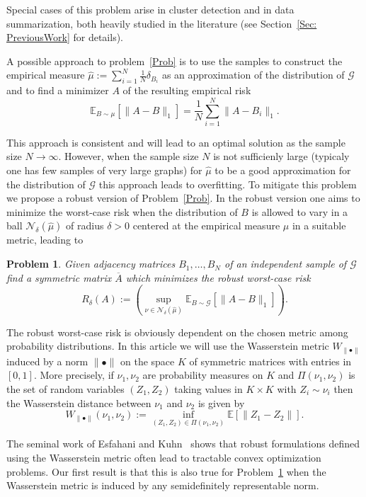 \documentclass[12pt]{amsart}
\newtheorem{problem}[lemma]{Problem}
\theoremstyle{remark}
\newcommand{\EE}{\mathbb{E}}
\newcommand{\grG}{{\mathcal{G}}}
\begin{document}
Special cases of this problem arise in cluster detection and in data summarization, both heavily studied in the literature (see Section~\ref{Sec: PreviousWork} for details).

A possible approach to problem~\ref{Prob} is to use the samples to construct the empirical measure $\hat{\mu}:=\sum_{i=1}^N \frac{1}{N}\delta_{B_i}$ as an approximation of the distribution of $\grG$ and to find a minimizer $A$ of the resulting empirical risk
\[ \EE_{B\sim \mu}[\|A-B\|_1]=\frac{1}{N}\sum_{i=1}^N \|A-B_i\|_1.\]

This approach is consistent and will lead to an optimal solution as the sample size $N\rightarrow \infty$. However, when the sample size $N$ is not sufficienly large (typicaly one has few samples of very large graphs) for $\hat{\mu}$ to be a good approximation for the distribution of $\grG$ this approach leads to overfitting. To mitigate this problem we propose a robust version of Problem~\ref{Prob}. In the robust version one aims to minimize the worst-case risk when the distribution of $B$ is allowed to vary in a ball $\mathcal{N}_{\delta}(\hat{\mu})$ of radius $\delta>0$ centered at the empirical measure $\hat{\mu}$ in a suitable metric, leading to 

\begin{problem}\label{ProbRobusto} Given adjacency matrices $B_1,\dots, B_N$ of an independent sample of $\grG$ find a symmetric matrix $\overline{A}$ which minimizes the robust worst-case risk 
\[R_{\delta}(A):=\left(\sup_{\nu\in \mathcal{N}_{\delta}(\hat{\mu})} \EE_{B\sim \grG}[\|A-B\|_1]\right).\] 
\end{problem}
The robust worst-case risk is obviously dependent on the chosen metric among probability distributions. In this article we will use the Wasserstein metric $W_{\|\bullet\|}$ induced by a norm $\|\bullet\|$ on the space $K$ of symmetric matrices with entries in $[0,1]$. More precisely, if $\nu_1,\nu_2$ are probability measures on $K$ and $\Pi(\nu_1,\nu_2)$ is the set of random variables $(Z_1,Z_2)$ taking values in $K\times K$  with $Z_i\sim \nu_i$ then the Wasserstein distance between $\nu_1$ and $\nu_2$ is given by 
\[ W_{\|\bullet\|}(\nu_1,\nu_2):=\inf_{(Z_1,Z_2)\in \Pi(\nu_1,\nu_2)} \EE[\|Z_1-Z_2\|].\]

The seminal work of Esfahani and Kuhn~\cite{EsfahaniKuhn} shows that robust formulations defined using the Wasserstein metric often lead to tractable convex optimization problems. Our first result is that this is also true for Problem~\ref{ProbRobusto} when the Wasserstein metric is induced by any semidefinitely representable norm.
\end{document}
